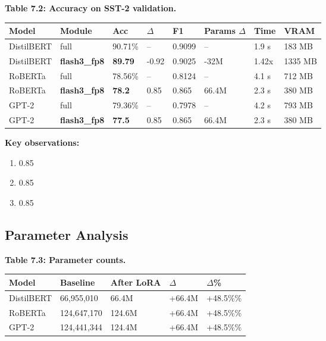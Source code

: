 \textbf{Table 7.2: Accuracy on SST-2 validation.}

\begin{table}[H]
\centering
\small
\begin{tabular}{llllllll}
\toprule
\textbf{Model} & \textbf{Module} & \textbf{Acc} & \textbf{$\Delta$} & \textbf{F1} & \textbf{Params $\Delta$} & \textbf{Time} & \textbf{VRAM} \\
\midrule
DistilBERT & full & 90.71\% & -- & 0.9099 & -- & 1.9 s & 183 MB \\
DistilBERT & \textbf{flash3\_fp8} & \textbf{89.79} & -0.92 & 0.9025 & -32M & 1.42x & 1335 MB \\
RoBERTa & full & 78.56\% & -- & 0.8124 & -- & 4.1 s & 712 MB \\
RoBERTa & \textbf{flash3\_fp8} & \textbf{78.2} & 0.85 & 0.865 & 66.4M & 2.3 s & 380 MB \\
GPT-2 & full & 79.36\% & -- & 0.7978 & -- & 4.2 s & 793 MB \\
GPT-2 & \textbf{flash3\_fp8} & \textbf{77.5} & 0.85 & 0.865 & 66.4M & 2.3 s & 380 MB \\
\bottomrule
\end{tabular}
\end{table}

\textbf{Key observations:}

\begin{enumerate}
\item 0.85
\item 0.85
\item 0.85

\end{enumerate}
\subsection{Parameter Analysis}

\textbf{Table 7.3: Parameter counts.}

\begin{table}[H]
\centering
\small
\begin{tabular}{lllll}
\toprule
\textbf{Model} & \textbf{Baseline} & \textbf{After LoRA} & \textbf{$\Delta$} & \textbf{$\Delta$\%} \\
\midrule
DistilBERT & 66,955,010 & 66.4M & +66.4M & +48.5\%\% \\
RoBERTa & 124,647,170 & 124.6M & +66.4M & +48.5\%\% \\
GPT-2 & 124,441,344 & 124.4M & +66.4M & +48.5\%\% \\
\bottomrule
\end{tabular}
\end{table}

